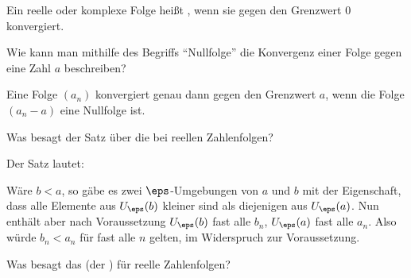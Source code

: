 \begin{antwort}
  Ein reelle oder komplexe Folge heißt , wenn sie gegen 
  den Grenzwert $0$ konvergiert. 
  \AntEnd
\end{antwort}

\begin{frage}%
  \label{02_nuko}
  Wie kann man mithilfe des Begriffs "`Nullfolge"' die Konvergenz einer 
  Folge gegen eine Zahl $a$ beschreiben?
\end{frage}

\begin{antwort}
  
  Eine Folge $(a_n)$ konvergiert genau dann gegen den Grenzwert 
  $a$, wenn 
  die Folge $(a_n-a)$ eine Nullfolge ist. 
  \AntEnd
\end{antwort}

\begin{frage}%
  \label{02_gmon}
  Was besagt der Satz über die  bei reellen 
  Zahlenfolgen?
\end{frage}

\begin{antwort}
  Der Satz lautet: 

  \medskip\noindent

  \medskip\noindent
  Wäre $b<a$, so gäbe es zwei 
  $\eps$-Umgebungen von $a$ und $b$ mit der Eigenschaft, dass 
  alle Elemente aus $U_\eps(b)$ kleiner  
  sind als diejenigen aus $U_\eps(a)$. Nun enthält aber 
  nach Voraussetzung $U_\eps(b)$ fast alle 
  $b_n$, $U_\eps(a)$ fast alle $a_n$. Also würde $b_n<a_n$ für fast alle 
  $n$ gelten, im Widerspruch zur Voraussetzung. 
  \AntEnd
\end{antwort}

\begin{frage}%
  \label{02_sndw}
  Was besagt das  (der ) 
  für reelle Zahlenfolgen? 
\end{frage}

